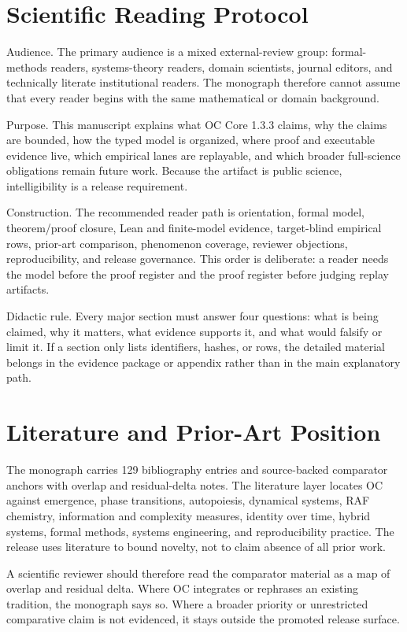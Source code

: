 \section{Scientific Reading Protocol}
\label{sec:oc133-reader-contract-scientific-route}
Audience. The primary audience is a mixed external-review group: formal-methods readers, systems-theory readers, domain scientists, journal editors, and technically literate institutional readers. The monograph therefore cannot assume that every reader begins with the same mathematical or domain background.

Purpose. This manuscript explains what OC Core 1.3.3 claims, why the claims are bounded, how the typed model is organized, where proof and executable evidence live, which empirical lanes are replayable, and which broader full-science obligations remain future work. Because the artifact is public science, intelligibility is a release requirement.

Construction. The recommended reader path is orientation, formal model, theorem/proof closure, Lean and finite-model evidence, target-blind empirical rows, prior-art comparison, phenomenon coverage, reviewer objections, reproducibility, and release governance. This order is deliberate: a reader needs the model before the proof register and the proof register before judging replay artifacts.

Didactic rule. Every major section must answer four questions: what is being claimed, why it matters, what evidence supports it, and what would falsify or limit it. If a section only lists identifiers, hashes, or rows, the detailed material belongs in the evidence package or appendix rather than in the main explanatory path.


\section{Literature and Prior-Art Position}
\label{sec:oc133-literature-prior-art-position}
The monograph carries 129 bibliography entries and source-backed comparator anchors with overlap and residual-delta notes. The literature layer locates OC against emergence, phase transitions, autopoiesis, dynamical systems, RAF chemistry, information and complexity measures, identity over time, hybrid systems, formal methods, systems engineering, and reproducibility practice. The release uses literature to bound novelty, not to claim absence of all prior work.

A scientific reviewer should therefore read the comparator material as a map of overlap and residual delta. Where OC integrates or rephrases an existing tradition, the monograph says so. Where a broader priority or unrestricted comparative claim is not evidenced, it stays outside the promoted release surface.


